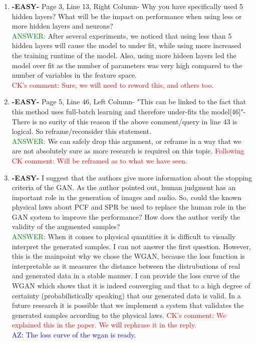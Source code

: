 \documentclass{article}
\begin{document}
\begin{enumerate}
    \item \textbf{-EASY-} Page 3, Line 13, Right Column- Why you have specifically used 5 hidden layers? What will be the impact on performance when using less or more hidden layers and neurons?\\
    \textcolor{green}{ANSWER: } After several experiments, we noticed that using less than 5 hidden layers will cause the model to under fit, while using more increased the training runtime of the model. Also, using more hideen layers led the model over fit as the number of parameters was very high compared to the number of variables in the feature space.  \\ \textcolor{red}{ CK's comment: Sure, we will need to reword this, and others too.}

   
	\item \textbf{-EASY-} Page 5, Line 46, Left Column- "This can be linked to the fact that this method uses full-batch learning and therefore under-fits the model[46]"- There is no surity of this reason if the above comment/query in line 43 is logical. So reframe/reconsider this statement. \\
	
	\textcolor{green}{ANSWER: } We can safely drop this argument, or reframe in a way that we are not absolutely sure as more research is required on this topic. \textcolor{red}{Following CK comment: Will be reframed as to what we have seen.}

	\item \textbf{-EASY-} I suggest that the authors give more information about the stopping criteria of the GAN. As the author pointed out, human judgment has an important role in the generation of images and audio. So, could the known physical laws about PCF and SPR be used to replace the human role in the GAN system to improve the performance? How does the author verify the validity of the augmented samples? \\
	\textcolor{green}{ANSWER: } When it comes to physical quantities it is difficult to visually interpret the generated samples. I can not answer the first question. However, this is the mainpoint why we chose the WGAN, because the loss function is interpretable as it measures the distance between the distrubutions of real and generated data in a stable manner. I can provide the loss curve of the WGAN which shows that it is indeed converging and that to a high degree of certainty (probabilistically speaking) that our generated data is valid. In a future research it is possible that we implement a system that validates the generated samples according to the physical laws. \textcolor{red}{CK's comment: We explained this in the paper. We will rephrase it in the reply. } \\ \textcolor{blue}{AZ: The loss curve of the wgan is ready.}


\end{enumerate}
\end{document}

